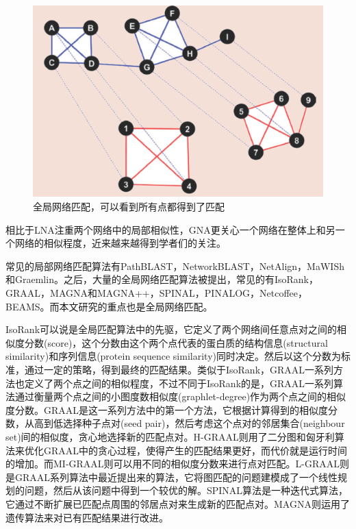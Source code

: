 \begin{figure}[htbp]
\centering
\includegraphics[height=0.25\textheight]{pic/gna.png}
\captionsetup{margin=50pt}
\caption{全局网络匹配，可以看到所有点都得到了匹配 \cite{atias2012comparative} \label{fig:gna}}
\end{figure}
相比于LNA注重两个网络中的局部相似性，GNA更关心一个网络在整体上和另一个网络的相似程度，近来越来越得到学者们的关注。

常见的局部网络匹配算法有PathBLAST\cite{kelley2004pathblast}，NetworkBLAST\cite{sharan2005conserved}，NetAlign\cite{liang2006netalign}，MaWISh\cite{koyuturk2006pairwise}和Graemlin\cite{flannick2006graemlin}。之后，大量的全局网络匹配算法被提出，常见的有IsoRank\cite{singh2008global,liao2009isorankn}，GRAAL\cite{kuchaiev2011integrative,malod2015graal,kuchaiev2010topological,milenkovic2010optimal,memivsevic2012c}，MAGNA和MAGNA++\cite{saraph2014magna,vijayan2015magna++}，SPINAL\cite{aladaug2013spinal}，PINALOG\cite{phan2012pinalog}，Netcoffee\cite{hu2013netcoffee}，BEAMS\cite{alkan2014beams}。而本文研究的重点也是全局网络匹配。

IsoRank\cite{singh2008global}可以说是全局匹配算法中的先驱，它定义了两个网络间任意点对之间的相似度分数(score)，这个分数由这个两个点代表的蛋白质的结构信息(structural similarity)和序列信息(protein sequence similarity)同时决定。然后以这个分数为标准，通过一定的策略，得到最终的匹配结果。类似于IsoRank，GRAAL一系列方法也定义了两个点之间的相似程度，不过不同于IsoRank的是，GRAAL一系列算法通过衡量两个点之间的小图度数相似度(graphlet-degree)作为两个点之间的相似度分数。GRAAL\cite{kuchaiev2010topological}是这一系列方法中的第一个方法，它根据计算得到的相似度分数，从高到低选择种子点对(seed pair)，然后考虑这个点对的邻居集合(neighbour set)间的相似度，贪心地选择新的匹配点对。H-GRAAL\cite{milenkovic2010optimal}则用了二分图和匈牙利算法来优化GRAAL中的贪心过程，使得产生的匹配结果更好，而代价就是运行时间的增加。而MI-GRAAL\cite{kuchaiev2011integrative}则可以用不同的相似度分数来进行点对匹配。L-GRAAL\cite{malod2015graal}则是GRAAL系列算法中最近提出来的算法，它将图匹配的问题建模成了一个线性规划的问题，然后从该问题中得到一个较优的解。SPINAL算法\cite{aladaug2013spinal}是一种迭代式算法，它通过不断扩展已匹配点周围的邻居点对来生成新的匹配点对。MAGNA\cite{saraph2014magna}则运用了遗传算法来对已有匹配结果进行改进。

